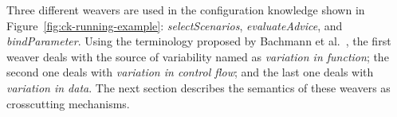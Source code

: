 \documentclass{acm_proc_article-sp}
\begin{document}
Three different weavers are used in the configuration knowledge shown in
Figure~\ref{fig:ck-running-example}: \emph{selectScenarios},
\emph{evaluateAdvice}, and \emph{bindParameter}. Using the terminology
proposed by Bachmann et al.~\cite{Bachmann:2001aa}, the first weaver deals with
the source of variability named as \emph{variation in function}; the second one
deals with \emph{variation in control flow}; and the last one deals with
\emph{variation in data}. The next section describes the semantics of these
weavers as crosscutting mechanisms. 


\end{document}
